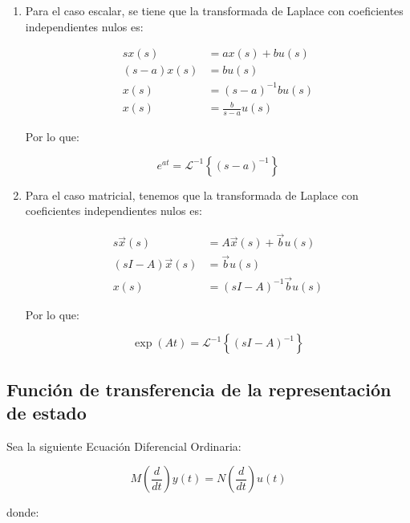 \documentclass[12pt]{article}
\numberwithin{equation}{subsection}
\begin{document}
\begin{enumerate}

\item
Para el caso escalar, se tiene que la transformada de Laplace con coeficientes independientes nulos es:

\begin{align}
s x(s)       & = a x(s) + b u(s) \nonumber\\
(s - a) x(s) & = b u(s) \nonumber\\
x(s)         & = (s - a)^{-1} b u(s) \nonumber\\
x(s)         & = \frac{b}{s - a} u(s) \nonumber
\end{align}

Por lo que:

\begin{equation}
e^{at} = \mathcal{L}^{-1} \left\{ (s - a)^{-1} \right\}
\end{equation}

\item
Para el caso matricial, tenemos que la transformada de Laplace con coeficientes independientes nulos es:

\begin{align}
s \vec{x}(s)         & = A \vec{x}(s) + \vec{b} u(s) \nonumber \\
(s I - A) \vec{x}(s) & = \vec{b} u(s) \nonumber \\
x(s)                 & = (s I - A)^{-1} \vec{b} u(s) \nonumber
\end{align}

Por lo que:

\begin{equation}
\exp{(At)} = \mathcal{L}^{-1} \left\{ (s I - A)^{-1} \right\}
\end{equation}

\end{enumerate}

\subsection{Función de transferencia de la representación de estado}

Sea la siguiente Ecuación Diferencial Ordinaria:

\begin{equation}
M \left( \frac{d}{dt} \right) y(t) = N \left( \frac{d}{dt} \right) u(t) \nonumber
\end{equation}

donde:
\end{document}
